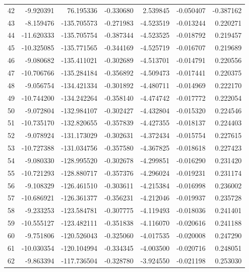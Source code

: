 \begin{tabular}{rrrrrrr}
 42 &  -9.920391 &   76.195336 & -0.330680 &   2.539845 &  -0.050407 & -0.387162 \\
 43 &  -8.159476 & -135.705573 & -0.271983 &  -4.523519 &  -0.013244 &  0.220271 \\
 44 & -11.620333 & -135.705754 & -0.387344 &  -4.523525 &  -0.018792 &  0.219457 \\
 45 & -10.325085 & -135.771565 & -0.344169 &  -4.525719 &  -0.016707 &  0.219689 \\
 46 &  -9.080682 & -135.411021 & -0.302689 &  -4.513701 &  -0.014791 &  0.220556 \\
 47 & -10.706766 & -135.284184 & -0.356892 &  -4.509473 &  -0.017441 &  0.220375 \\
 48 &  -9.056754 & -134.421334 & -0.301892 &  -4.480711 &  -0.014969 &  0.222170 \\
 49 & -10.744200 & -134.242264 & -0.358140 &  -4.474742 &  -0.017772 &  0.222054 \\
 50 &  -9.072804 & -132.984107 & -0.302427 &  -4.432804 &  -0.015320 &  0.224546 \\
 51 & -10.735170 & -132.820655 & -0.357839 &  -4.427355 &  -0.018137 &  0.224403 \\
 52 &  -9.078924 & -131.173029 & -0.302631 &  -4.372434 &  -0.015754 &  0.227615 \\
 53 & -10.727388 & -131.034756 & -0.357580 &  -4.367825 &  -0.018618 &  0.227423 \\
 54 &  -9.080330 & -128.995520 & -0.302678 &  -4.299851 &  -0.016290 &  0.231420 \\
 55 & -10.721293 & -128.880717 & -0.357376 &  -4.296024 &  -0.019231 &  0.231174 \\
 56 &  -9.108329 & -126.461510 & -0.303611 &  -4.215384 &  -0.016998 &  0.236002 \\
 57 & -10.686921 & -126.361377 & -0.356231 &  -4.212046 &  -0.019937 &  0.235728 \\
 58 &  -9.233253 & -123.584781 & -0.307775 &  -4.119493 &  -0.018036 &  0.241401 \\
 59 & -10.555127 & -123.482111 & -0.351838 &  -4.116070 &  -0.020616 &  0.241188 \\
 60 &  -9.751806 & -120.526043 & -0.325060 &  -4.017535 &  -0.020008 &  0.247290 \\
 61 & -10.030354 & -120.104994 & -0.334345 &  -4.003500 &  -0.020716 &  0.248051 \\
 62 &  -9.863394 & -117.736504 & -0.328780 &  -3.924550 &  -0.021198 &  0.253030 \\

\end{tabular}
